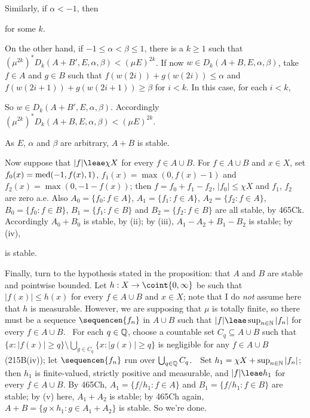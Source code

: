 {\noindent Similarly, if $\alpha<-1$, then


\noindent for some $k$.

On the other hand, if $-1\le\alpha<\beta\le 1$, there is a $k\ge 1$ such
that $(\mu^{2k})^*D_k(A+B',E,\alpha,\beta)<(\mu E)^{2k}$.   If now
$w\in D_k(A+B,E,\alpha,\beta)$, take $f\in A$ and $g\in B$ such that
$f(w(2i))+g(w(2i))\le\alpha$ and $f(w(2i+1))+g(w(2i+1))\ge\beta$ for $i<k$.
In this case, for each $i<k$,


\noindent So $w\in D_k(A+B',E,\alpha,\beta)$.   Accordingly
$(\mu^{2k})^*D_k(A+B,E,\alpha,\beta)<(\mu E)^{2k}$.

As $E$, $\alpha$ and $\beta$ are arbitrary, $A+B$ is stable.\ \Qed

\medskip

 Now suppose that $|f|\leae\chi X$ for every $f\in A\cup B$.
For $f\in A\cup B$ and $x\in X$, set $f_0(x)=\mathop{\text{med}}(-1,f(x),1)$,
$f_1(x)=\max(0,f(x)-1)$ and $f_2(x)=\max(0,-1-f(x))$; then $f=f_0+f_1-f_2$,
$|f_0|\le\chi X$ and $f_1$, $f_2$ are zero a.e.   Also
$A_0=\{f_0:f\in A\}$, $A_1=\{f_1:f\in A\}$, $A_2=\{f_2:f\in A\}$,
$B_0=\{f_0:f\in B\}$, $B_1=\{f_1:f\in B\}$ and $B_2=\{f_2:f\in B\}$ are all
stable, by 465Ck.   Accordingly $A_0+B_0$ is stable, by (ii);
by (iii), $A_1-A_2+B_1-B_2$ is stable;  by (iv),


\noindent is stable.

\medskip

 Finally, turn to the hypothesis stated in the proposition:
that $A$ and $B$ are stable and pointwise bounded.   Let
$h:X\to\coint{0,\infty}$ be such that $|f(x)|\le h(x)$ for every
$f\in A\cup B$ and $x\in X$;  note that I do {\it not} assume here that $h$
is measurable.   However, we are supposing that $\mu$ is totally finite, so
there must be a sequence $\sequencen{f_n}$ in $A\cup B$ such that
$|f|\leae\sup_{n\in\Bbb N}|f_n|$ for every $f\in A\cup B$.   \Prf\ For each
$q\in\Bbb Q$, choose a countable set $C_q\subseteq A\cup B$ such that
$\{x:|f(x)|\ge q\}\setminus\bigcup_{g\in C_q}\{x:|g(x)|\ge q\}$ is
negligible for any $f\in A\cup B$
(215B(iv));  let $\sequencen{f_n}$ run over
$\bigcup_{q\in\Bbb Q}C_q$.\ \QeD\   Set
$h_1=\chi X+\sup_{n\in\Bbb N}|f_n|$;
then $h_1$ is finite-valued, strictly positive and measurable, and
$|f|\leae h_1$ for every $f\in A\cup B$.   By 465Ch, $A_1=\{f/h_1:f\in A\}$
and $B_1=\{f/h_1:f\in B\}$ are stable;  by (v) here, $A_1+A_2$ is stable;
by 465Ch again, $A+B=\{g\times h_1:g\in A_1+A_2\}$ is stable.   So we're
done.

}
